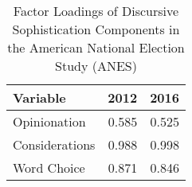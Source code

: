 \begin{table}[ht]
\centering
\caption{Factor Loadings of Discursive Sophistication Components
         in the American National Election Study (ANES)} 
\label{app:factload}
\begin{tabular}{lrr}
  \hline
Variable & 2012 & 2016 \\ 
  \hline
Opinionation & 0.585 & 0.525 \\ 
  Considerations & 0.988 & 0.998 \\ 
  Word Choice & 0.871 & 0.846 \\ 
   \hline
\end{tabular}
\end{table}
